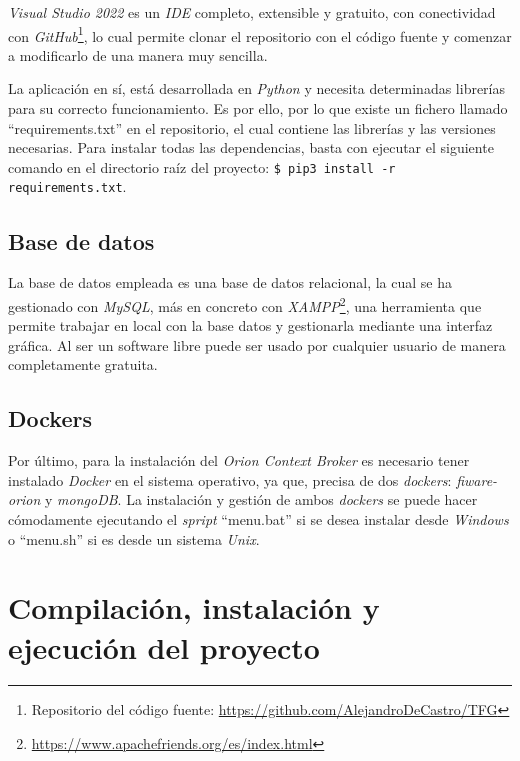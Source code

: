 \textit{Visual Studio 2022} es un \textit{IDE} completo, extensible y gratuito, con conectividad con \textit{GitHub}\footnote{Repositorio del código fuente: \url{https://github.com/AlejandroDeCastro/TFG}}, lo cual permite clonar el repositorio con el código fuente y comenzar a modificarlo de una manera muy sencilla.

La aplicación en sí, está desarrollada en \textit{Python} y necesita determinadas librerías para su correcto funcionamiento. Es por ello, por lo que existe un fichero llamado ``requirements.txt'' en el repositorio, el cual contiene las librerías y las versiones necesarias. Para instalar todas las dependencias, basta con ejecutar el siguiente comando en el directorio raíz del proyecto: \texttt{\$ pip3 install -r requirements.txt}.

\subsection{Base de datos}

La base de datos empleada es una base de datos relacional, la cual se ha gestionado con \textit{MySQL}, más en concreto con \textit{XAMPP}\footnote{\url{https://www.apachefriends.org/es/index.html}}, una herramienta que permite trabajar en local con la base datos y gestionarla mediante una interfaz gráfica. Al ser un software libre puede ser usado por cualquier usuario de manera completamente gratuita.

\subsection{Dockers}

Por último, para la instalación del \textit{Orion Context Broker} es necesario tener instalado \textit{Docker} en el sistema operativo, ya que, precisa de dos \textit{dockers}: \textit{fiware-orion} y \textit{mongoDB}.
La instalación y gestión de ambos \textit{dockers} se puede hacer cómodamente ejecutando el \textit{spript} ``menu.bat'' si se desea instalar desde \textit{Windows} o ``menu.sh'' si es desde un sistema \textit{Unix}.

\section{Compilación, instalación y ejecución del proyecto}

